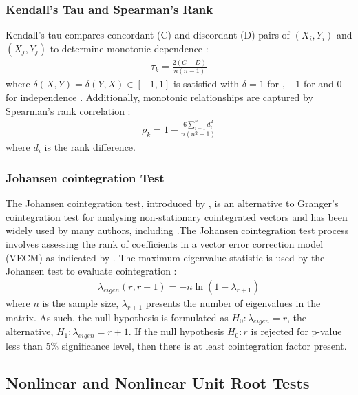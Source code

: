 \documentclass[a4paper]{article}
\theoremstyle{plain}
\theoremstyle{definition}
\theoremstyle{remark}
\begin{document}
\subsubsection*{Kendall's Tau and Spearman's Rank}

Kendall's tau compares concordant (C) and discordant (D) pairs of $(X_i, Y_i)$ and $(X_j, Y_j)$ to determine monotonic dependence \citep{shiekh2022comparison}:
\begin{align} 
\tau_k = \frac{2(C - D)}{n(n - 1)} 
\end{align}
where $\delta(X,Y) = \delta(Y,X) \in [-1,1]$ is satisfied with $\delta = 1$ for  , $-1$ for  and $0$ for independence \citep{molefe2020roads}.
Additionally, monotonic relationships are captured by Spearman's rank correlation \citep{gauthier2001detecting}:
\begin{align}
\rho_k = 1 - \frac{6\sum_{i=1}^{n} d_i^2}{n(n^2 - 1)} 
\end{align} 
where $d_i$ is the rank difference.

\subsubsection*{Johansen cointegration Test}
The Johansen cointegration test, introduced by \cite{johansen1988statistical}, is an alternative to Granger's cointegration test for analysing non-stationary cointegrated vectors and has been widely used by many authors, including \cite{poh1997performance}.The Johansen cointegration
test process involves assessing the rank of coefficients in a vector error correction
model (VECM) as indicated by \cite{lutkepohl2005new}.
The maximum eigenvalue statistic is used by the Johansen test to evaluate cointegration \citep{johansen1988statistical}:
\begin{align} \lambda_{eigen}(r, r+1) = -n \ln(1 - \lambda_{r+1})
\end{align}
where $n$ is the sample size, $\lambda_{r+1}$ presents the number of eigenvalues in the matrix. As such, the null hypothesis is formulated as $H_{0}:\lambda_{eigen} = r $, the alternative, $H_{1}: \lambda_{eigen} = r+1$.
If the null hypothesis $H_0: r$ is rejected for p-value less than 5\% significance level, then there is at least cointegration factor present.

\subsection{Nonlinear and Nonlinear Unit Root Tests}
\end{document}
